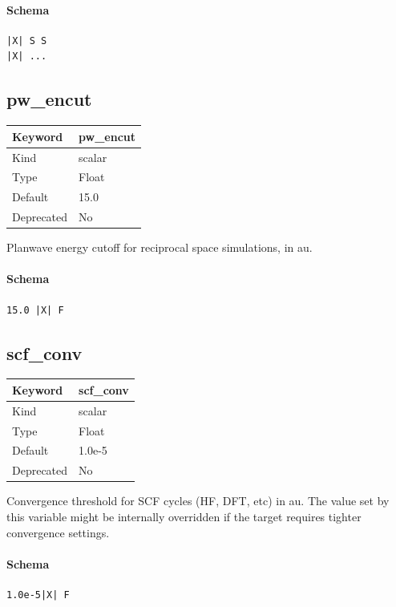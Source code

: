 \documentclass[11pt]{article}
\begin{document}
\paragraph{Schema}
\begin{Verbatim}
|X| S S
|X| ...
\end{Verbatim}

\subsection{pw\_encut}
\label{kw:pw-encut}
\begin{longtable}{|p{1.5in}|p{4.5in}|}
\hline
Keyword & pw\_encut \\
\hline
Kind & scalar \\
\hline
Type & Float \\
\hline
Default & 15.0 \\
\hline
Deprecated & No \\
\hline
\end{longtable}
 Planwave energy cutoff for reciprocal space simulations, in au.

\paragraph{Schema}
\begin{Verbatim}
15.0 |X| F
\end{Verbatim}

\subsection{scf\_conv}
\label{kw:scf-conv}
\begin{longtable}{|p{1.5in}|p{4.5in}|}
\hline
Keyword & scf\_conv \\
\hline
Kind & scalar \\
\hline
Type & Float \\
\hline
Default & 1.0e-5 \\
\hline
Deprecated & No \\
\hline
\end{longtable}
 Convergence threshold for SCF cycles (HF, DFT, etc) in au. The value set by
 this variable might be internally overridden if the target requires tighter
 convergence settings.

\paragraph{Schema}
\begin{Verbatim}
1.0e-5|X| F
\end{Verbatim}
\end{document}
